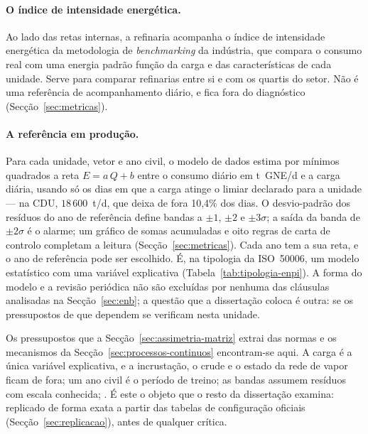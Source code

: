 \paragraph{O índice de intensidade energética.} Ao lado das retas internas, a
refinaria acompanha o índice de intensidade energética da metodologia de
\emph{benchmarking} da indústria, que compara o consumo real com uma energia
padrão função da carga e das características de cada unidade. Serve para
comparar refinarias entre si e com os quartis do setor. Não é uma
referência de acompanhamento diário, e fica fora do diagnóstico
(Secção~\ref{sec:metricas}).

\paragraph{A referência em produção.} Para cada unidade, vetor e ano civil,
o modelo de dados estima por mínimos quadrados a reta $E = a\,Q + b$ entre o
consumo diário em t~GNE/d e a carga diária, usando só os dias em que a carga
atinge o limiar declarado para a unidade --- na CDU, $18\,600$~t/d, que deixa de
fora 10,4\% dos dias. O desvio-padrão dos resíduos do ano de referência
define bandas a $\pm1$, $\pm2$ e $\pm3\sigma$; a saída da banda de $\pm2\sigma$
é o alarme; um gráfico de somas acumuladas e oito regras de carta de controlo
completam a leitura (Secção~\ref{sec:metricas}). Cada ano tem a sua reta, e o
ano de referência pode ser escolhido. É, na tipologia da ISO~50006, um modelo
estatístico com uma variável explicativa (Tabela~\ref{tab:tipologia-enpi}). A
forma do modelo e a revisão periódica não são excluídas por nenhuma das
cláusulas analisadas na Secção~\ref{sec:enb}; a questão que a dissertação
coloca é outra: se os pressupostos de que dependem se verificam nesta unidade.

Os pressupostos que a Secção~\ref{sec:assimetria-matriz} extrai das normas e
os mecanismos da Secção~\ref{sec:processos-continuos} encontram-se aqui. A
carga é a única variável explicativa, e a incrustação, o crude e o estado da
rede de vapor ficam de fora; um ano civil é o período de treino; as bandas
assumem resíduos com escala conhecida; . É este o objeto que o resto da dissertação examina: replicado de
forma exata a partir das tabelas de configuração oficiais
(Secção~\ref{sec:replicacao}), antes de qualquer crítica.

